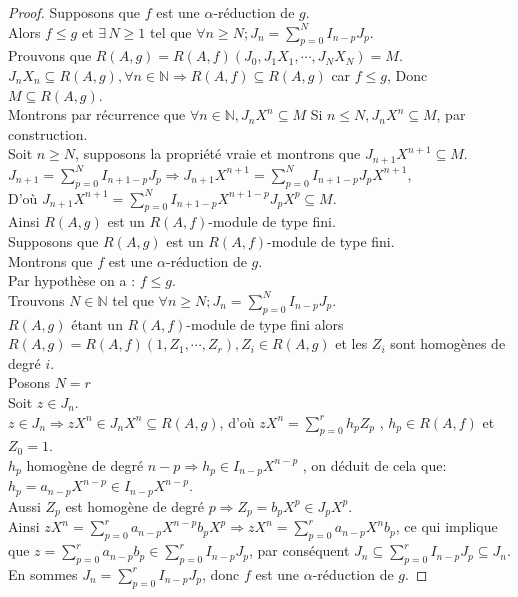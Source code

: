 \begin{proof}
	Supposons que $f$ est une $\alpha$-réduction de $g$.\\
	Alors $f \leq g$ et $\exists \, N \geq 1$ tel que $\forall n \geq N ; J_n = \displaystyle \sum_{p=0}^{N}{I_{n-p} J_p}$.\\
	Prouvons que $R(A,g) = R(A,f)(J_0, J_1X_1, \cdots , J_NX_N) = M$.\\
	$J_nX_n \subseteq R(A,g), \forall n \in \mathbb{N} \Rightarrow R(A,f) \subseteq R(A,g)$ car $f \leq g$,
	Donc $M \subseteq R(A,g)$.\\
	Montrons par récurrence que $\forall n \in \mathbb{N}, J_nX^n \subseteq M$
	Si $n \leq N, J_nX^n \subseteq M$, par construction.\\
	Soit $n \geq N$, supposons la propriété vraie et montrons que $J_{n+1}X^{n+1} \subseteq M$.\\
	$J_{n+1} = \displaystyle \sum_{p=0}^{N}{I_{n+1-p} J_p} \Rightarrow J_{n+1}X^{n+1} = \displaystyle \sum_{p=0}^{N}{I_{n+1-p} J_pX^{n+1}}$, \\
	D’où $ J_{n+1}X^{n+1} = \displaystyle \sum_{p=0}^{N}{I_{n+1-p}X^{n+1-p} J_pX^{p}} \subseteq M$.\\
	Ainsi $R(A,g)$ est un $R(A,f)$-module de type fini.\\
	Supposons que $R(A,g)$ est un $R(A,f)$-module de type fini.\\
	Montrons que $f$ est une $\alpha$-réduction de $g$.\\
	Par hypothèse on a : $f \leq g$.\\
	Trouvons $N \in \mathbb{N}$ tel que $\forall n \geq N ; J_n = \displaystyle \sum_{p=0}^{N}{I_{n-p} J_p}$.\\
	$R(A,g)$ étant un $R(A,f)$-module de type fini alors \\
	$R(A,g) = R(A,f)(1, Z_1, \cdots , Z_r), Z_i \in R(A,g)$ et les $Z_i$ sont homogènes de degré $i$.\\
	Posons $N=r$\\
	Soit $z \in J_n$.\\
	$z \in J_n \Rightarrow zX^n \in J_nX^n \subseteq R(A,g)$, d'où $zX^n = \displaystyle \sum_{p=0}^{r}{h_p Z_p}$ , $h_p \in R(A,f)$ et $Z_0 = 1$.\\
	$h_p$ homogène de degré $n-p \Rightarrow h_p \in I_{n-p}X^{n-p}$ , on déduit de cela que: $h_p = a_{n-p}X^{n-p} \in I_{n-p}X^{n-p}$.\\
	Aussi $Z_p$ est homogène de degré $p \Rightarrow Z_p = b_{p}X^{p} \in J_pX^p$.\\
	Ainsi $zX^n = \displaystyle \sum_{p=0}^{r}{a_{n-p}X^{n-p} b_{p}X^{p}} \Rightarrow zX^n = \displaystyle \sum_{p=0}^{r}{a_{n-p}X^{n} b_{p}}$, ce qui implique que $z = \displaystyle \sum_{p=0}^{r}{a_{n-p} b_{p}} \in \displaystyle \sum_{p=0}^{r}{I_{n-p} J_{p}}$, par conséquent $J_n \subseteq \displaystyle \sum_{p=0}^{r}{I_{n-p} J_{p}} \subseteq J_n$.\\
	En sommes $J_n = \displaystyle \sum_{p=0}^{r}{I_{n-p} J_{p}}$, donc $f$ est une $\alpha$-réduction de $g$.
\end{proof}
